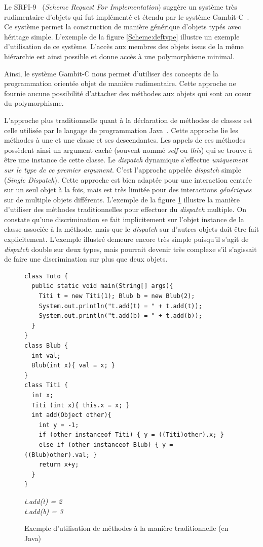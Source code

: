 \documentclass[12pt,oneside,letterpaper,francais]{book}
\begin{document}
Le SRFI-9~\cite{SRFI_9} (\textit{Scheme Request For Implementation})
suggère un système très rudimentaire d'objets qui fut implémenté et
étendu par le système Gambit-C~\cite{Gambit4}. Ce système permet la
construction de manière générique d'objets typés avec héritage
simple. L'exemple de la figure \ref{Scheme:deftype} illustre un
exemple d'utilisation de ce système. L'accès aux membres des objets
issus de la même hiérarchie est ainsi possible et donne accès à une
polymorphisme minimal.

Ainsi, le système Gambit-C nous permet d'utiliser des concepts de la
programmation orientée objet de manière rudimentaire. Cette approche
ne fournie aucune possibilité d'attacher des méthodes aux objets qui
sont au coeur du polymorphisme.

L'approche plus traditionnelle quant à la déclaration de méthodes de
classes est celle utilisée par le langage de programmation
Java~\cite{JavaSpec}. Cette approche lie les méthodes à une et une
classe et ses descendantes. Les appels de ces méthodes possèdent ainsi
un argument caché (souvent nommé \textit{self} ou \textit{this}) qui
se trouve à être une instance de cette classe. Le \textit{dispatch}
dynamique s'effectue \emph{uniquement sur le type de ce premier
  argument}. C'est l'approche appelée \textit{dispatch} simple
(\textit{Single Dispatch}). Cette approche est bien adaptée pour une
interaction centrée sur un seul objet à la fois, mais est très limitée
pour des interactions \emph{génériques} sur de multiple objets
différents. L'exemple de la figure \ref{OO:JavaDispatch} illustre la
manière d'utiliser des méthodes traditionnelles pour effectuer du
\textit{dispatch} multiple. On constate qu'une discrimination se fait
implicitement sur l'objet instance de la classe associée à la méthode,
mais que le \textit{dispatch} sur d'autres objets doit être fait
explicitement. L'exemple illustré demeure encore très simple puisqu'il
s'agit de \textit{dispatch} double sur deux types, mais pourrait
devenir très complexe s'il s'agissait de faire une discrimination sur
plus que deux objets.

\begin{figure}[htb!]
  \begin{verbatim}
class Toto {
  public static void main(String[] args){
    Titi t = new Titi(1); Blub b = new Blub(2);
    System.out.println("t.add(t) = " + t.add(t));
    System.out.println("t.add(b) = " + t.add(b));
  }
} 
class Blub {
  int val;
  Blub(int x){ val = x; }
}
class Titi {
  int x;
  Titi (int x){ this.x = x; }
  int add(Object other){
    int y = -1;
    if (other instanceof Titi) { y = ((Titi)other).x; }
    else if (other instanceof Blub) { y = ((Blub)other).val; }
    return x+y;
  }
}
  \end{verbatim}
  {{\it
t.add(t) = 2\\
t.add(b) = 3
  }}
  \caption{Exemple d'utilisation de méthodes à la manière
    traditionnelle (en Java)}
  \label{OO:JavaDispatch}
\end{figure}
\end{document}
